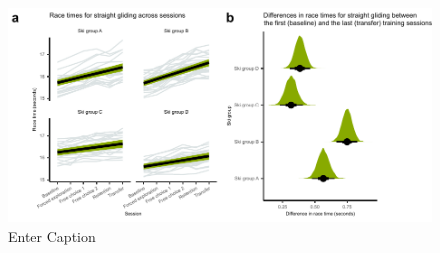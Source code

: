 \begin{figure}
    \centering
    \includegraphics[width=1\linewidth]{figure/figure_methodological_straightgliding.pdf}
    \caption{Enter Caption}
    \label{fig:straightgliding}
\end{figure}